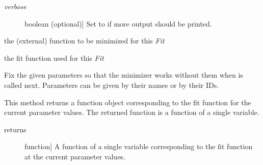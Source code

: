 \documentclass[a4paper,10pt,english]{sphinxmanual}
\begin{document}
\begin{fulllineitems}
\begin{fulllineitems}
\begin{description}
\item[{\emph{verbose}}] \leavevmode{[}boolean (optional){]}
Set to  if more output should be printed.

\end{description}

\end{fulllineitems}


\begin{fulllineitems}
\label{index:kafe.fit.Fit.external_fcn}
the (external) function to be minimized for this \emph{Fit}

\end{fulllineitems}


\begin{fulllineitems}
\label{index:kafe.fit.Fit.fit_function}
the fit function used for this \emph{Fit}

\end{fulllineitems}


\begin{fulllineitems}
\label{index:kafe.fit.Fit.fix_parameters}
Fix the given parameters so that the minimizer works without them
when  is called next. Parameters can be given by their
names or by their IDs.

\end{fulllineitems}


\begin{fulllineitems}
\label{index:kafe.fit.Fit.get_current_fit_function}
This method returns a function object corresponding to the fit function
for the current parameter values. The returned function is a function
of a single variable.
\begin{description}
\item[{returns}] \leavevmode{[}function{]}
A function of a single variable corresponding to the fit function
at the current parameter values.


\end{description}
\end{fulllineitems}
\end{fulllineitems}
\end{document}
